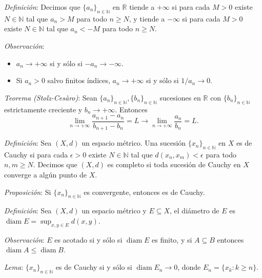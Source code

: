 \documentclass{beamer}
\begin{document}
  \begin{frame}
    \textit{Definición}: Decimos que $\{a_n\}_{n \in \mathbb{N}}$ en $\mathbb{R}$
    tiende a $+\infty$ si para cada $M > 0$ existe $N \in \mathbb{N}$ tal que
    $a_n > M$ para todo $n \geq N$, y tiende a $-\infty$ si para cada $M > 0$
    existe $N \in \mathbb{N}$ tal que $a_n < -M$ para todo $n \geq N$.
    \newline\newline
    \pause

    \textit{Observación}:
    \begin{itemize}[<+->]
      \item $a_n \to +\infty$ si y sólo si $-a_n \to -\infty$.
      \item Si $a_n > 0$ salvo finitos índices, $a_n \to +\infty$ si y sólo si
      $1/a_n \to 0$.
    \end{itemize}
  \end{frame}

  \begin{frame}
    \textit{Teorema (Stolz-Cesàro)}: Sean $\{a_n\}_{n \in \mathbb{N}},
    \{b_n\}_{n \in \mathbb{N}}$ sucesiones en $\mathbb{R}$ con
    $\{b_n\}_{n \in \mathbb{N}}$ estrictamente creciente y $b_n \to +\infty$.
    Entonces
    \[
      \lim_{n \to +\infty} \frac{a_{n+1} - a_n}{b_{n+1} - b_n} = L
      \rightarrow \lim_{n \to +\infty} \frac{a_n}{b_n} = L.
    \]
  \end{frame}

  \begin{frame}
    \textit{Definición}: Sea $(X, d)$ un espacio métrico. Una sucesión
    $\{x_n\}_{n \in \mathbb{N}}$ en $X$ es de Cauchy si para cada $\epsilon > 0$
    existe $N \in \mathbb{N}$ tal que $d(x_n, x_m) < \epsilon$ para todo
    $n, m \geq N$. Decimos que $(X, d)$ es completo si toda sucesión de Cauchy en
    $X$ converge a algún punto de $X$.
    \newline\newline
    \pause

    \textit{Proposición}: Si $\{x_n\}_{n \in \mathbb{N}}$ es convergente, entonces
    es de Cauchy.
  \end{frame}

  \begin{frame}
    \textit{Definición}: Sea $(X, d)$ un espacio métrico y $E \subseteq X$, el
    diámetro de $E$ es $\operatorname{diam} E = \sup_{x, y \in E} d(x, y)$.
    \newline\newline
    \pause

    \textit{Observación}: $E$ es acotado si y sólo si $\operatorname{diam} E$ es
    finito, y si $A \subseteq B$ entonces
    $\operatorname{diam} A \leq \operatorname{diam} B$.
    \newline\newline
    \pause

    \textit{Lema}: $\{x_n\}_{n \in \mathbb{N}}$ es de Cauchy si y sólo si
    $\operatorname{diam} E_n \to 0$, donde $E_n = \{x_k : k \geq n\}$.
  \end{frame}
\end{document}
